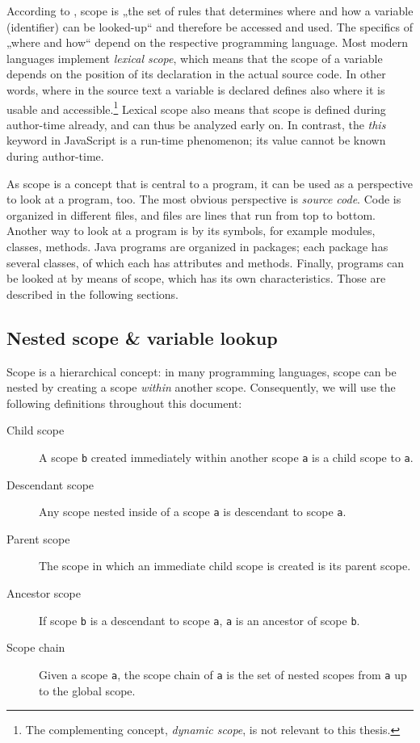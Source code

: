 According to , scope is „the set of rules that
determines where and how a \gls{variable} (\gls{identifier}) can be
looked-up“ and therefore be accessed and used. The specifics of „where
and how“ depend on the respective programming language. Most modern
languages implement \emph{lexical scope}, which means that the scope of
a variable depends on the position of its declaration in the actual
source code. In other words, where in the source text a variable is
declared defines also where it is usable and
accessible.\footnote{The complementing concept, \emph{dynamic scope}, is not relevant to this thesis.}
Lexical scope also means that scope is defined during author-time
already, and can thus be analyzed early on. In contrast, the \emph{this}
keyword in JavaScript is a run-time phenomenon; its value cannot be
known during author-time.

As scope is a concept that is central to a program, it can be used as a
perspective to look at a program, too. The most obvious perspective is
\emph{source code}. Code is organized in different files, and files are
lines that run from top to bottom. Another way to look at a program is
by its symbols, for example modules, classes, methods. Java programs are
organized in packages; each package has several classes, of which each
has attributes and methods. Finally, programs can be looked at by means
of scope, which has its own characteristics. Those are described in the
following sections.

\subsection{Nested scope \& variable
lookup}\label{nested-scope-variable-lookup}

Scope is a hierarchical concept: in many programming languages, scope
can be nested by creating a scope \emph{within} another scope.
Consequently, we will use the following definitions throughout this
document:

\begin{description}
\item[Child scope]
A scope \texttt{b} created immediately within another scope \texttt{a}
is a child scope to \texttt{a}.
\item[Descendant scope]
Any scope nested inside of a scope \texttt{a} is descendant to scope
\texttt{a}.
\item[Parent scope]
The scope in which an immediate child scope is created is its parent
scope.
\item[Ancestor scope]
If scope \texttt{b} is a descendant to scope \texttt{a}, \texttt{a} is
an ancestor of scope \texttt{b}.
\item[Scope chain]
Given a scope \texttt{a}, the scope chain of \texttt{a} is the set of
nested scopes from \texttt{a} up to the global scope.
\end{description}

